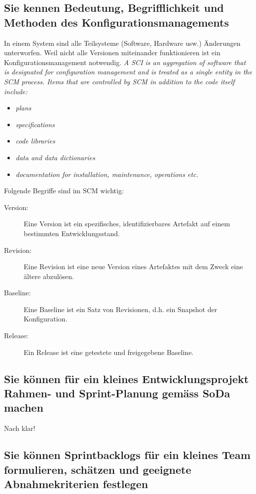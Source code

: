 \subsection{Sie kennen Bedeutung, Begrifflichkeit und Methoden des Konfigurationsmanagements}\label{sec:konfigurationsmanagement}

In einem System sind alle Teilsysteme (Software, Hardware usw.) Änderungen unterworfen. Weil nicht alle Versionen miteinander funktionieren ist ein Konfigurationsmanagement notwendig. \emph{A \ac{SCI} is an aggregation of software that is designated for configuration management and is treated as a single entity in the \ac{SCM} process. Items that are controlled by \ac{SCM} in addition to the code itself include:}

\begin{itemize}
	\item \emph{plans}
	\item \emph{specifications}
	\item \emph{code libraries}
	\item \emph{data and data dictionaries}
	\item \emph{documentation for installation, maintenance, operations etc.}
\end{itemize} 
Folgende Begriffe sind im \ac{SCM} wichtig:
\begin{description}
	\item[Version:] Eine Version ist ein spezifisches, identifizierbares Artefakt auf einem bestimmten Entwicklungsstand.
	\item[Revision:] Eine Revision ist eine neue Version eines Artefaktes mit dem Zweck eine ältere abzulösen.
	\item[Baseline:] Eine Baseline ist ein Satz von Revisionen, d.h. ein Snapshot der Konfiguration.
	\item[Release:] Ein Release ist eine getestete und freigegebene Baseline.
\end{description}

\subsection{Sie können für ein kleines Entwicklungsprojekt Rahmen- und Sprint-Planung gemäss SoDa machen}

Nach klar!

\subsection{Sie können Sprintbacklogs für ein kleines Team formulieren, schätzen und geeignete Abnahmekriterien festlegen}

